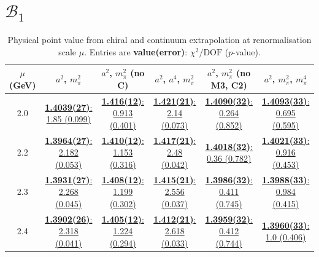 \documentclass[12pt]{extarticle}
\begin{document}
\clearpage
\section{$\mathcal{B}_1$}
\begin{table}[h!]
\begin{center}
\begin{tabular}{|c|c|c|c|c|c|}
\hline
$\mu$ (GeV) & $a^2$, $m_\pi^2$& $a^2$, $m_\pi^2$ (no C)& $a^2$, $a^4$, $m_\pi^2$& $a^2$, $m_\pi^2$ (no M3, C2)& $a^2$, $m_\pi^2$, $m_\pi^4$\\
\hline
2.0& \hyperlink{VVpAA/SUSY/a2m2_20.pdf.1}{\textbf{1.4039(27)}: 1.85 (0.099)} & \hyperlink{VVpAA/SUSY/a2m2noC_20.pdf.1}{\textbf{1.416(12)}: 0.913 (0.401)} & \hyperlink{VVpAA/SUSY/a2a4m2_20.pdf.1}{\textbf{1.421(21)}: 2.14 (0.073)} & \hyperlink{VVpAA/SUSY/a2m2mcut_20.pdf.1}{\textbf{1.4090(32)}: 0.264 (0.852)} & \hyperlink{VVpAA/SUSY/a2m2m4_20.pdf.1}{\textbf{1.4093(33)}: 0.695 (0.595)}\\
2.2& \hyperlink{VVpAA/SUSY/a2m2_22.pdf.1}{\textbf{1.3964(27)}: 2.182 (0.053)} & \hyperlink{VVpAA/SUSY/a2m2noC_22.pdf.1}{\textbf{1.410(12)}: 1.153 (0.316)} & \hyperlink{VVpAA/SUSY/a2a4m2_22.pdf.1}{\textbf{1.417(21)}: 2.48 (0.042)} & \hyperlink{VVpAA/SUSY/a2m2mcut_22.pdf.1}{\textbf{1.4018(32)}: 0.36 (0.782)} & \hyperlink{VVpAA/SUSY/a2m2m4_22.pdf.1}{\textbf{1.4021(33)}: 0.916 (0.453)}\\
2.3& \hyperlink{VVpAA/SUSY/a2m2_23.pdf.1}{\textbf{1.3931(27)}: 2.268 (0.045)} & \hyperlink{VVpAA/SUSY/a2m2noC_23.pdf.1}{\textbf{1.408(12)}: 1.199 (0.302)} & \hyperlink{VVpAA/SUSY/a2a4m2_23.pdf.1}{\textbf{1.415(21)}: 2.556 (0.037)} & \hyperlink{VVpAA/SUSY/a2m2mcut_23.pdf.1}{\textbf{1.3986(32)}: 0.411 (0.745)} & \hyperlink{VVpAA/SUSY/a2m2m4_23.pdf.1}{\textbf{1.3988(33)}: 0.984 (0.415)}\\
2.4& \hyperlink{VVpAA/SUSY/a2m2_24.pdf.1}{\textbf{1.3902(26)}: 2.318 (0.041)} & \hyperlink{VVpAA/SUSY/a2m2noC_24.pdf.1}{\textbf{1.405(12)}: 1.224 (0.294)} & \hyperlink{VVpAA/SUSY/a2a4m2_24.pdf.1}{\textbf{1.412(21)}: 2.618 (0.033)} & \hyperlink{VVpAA/SUSY/a2m2mcut_24.pdf.1}{\textbf{1.3959(32)}: 0.412 (0.744)} & \hyperlink{VVpAA/SUSY/a2m2m4_24.pdf.1}{\textbf{1.3960(33)}: 1.0 (0.406)}\\
\hline
\end{tabular}
\caption{Physical point value from chiral and continuum extrapolation at renormalisation scale $\mu$. Entries are \textbf{value(error)}: $\chi^2/\text{DOF}$ ($p$-value).}
\end{center}
\end{table}
\end{document}
